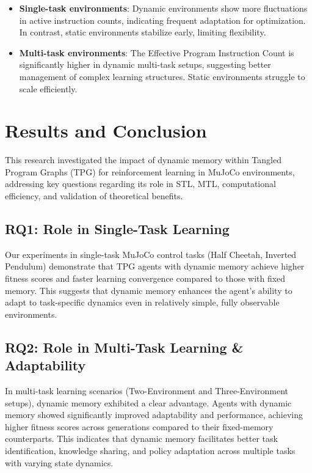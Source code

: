 \documentclass[sigconf]{acmart}
\begin{document}
\begin{itemize}
  \item \textbf{Single-task environments}: Dynamic environments show more fluctuations in active instruction counts, indicating frequent adaptation for optimization. In contrast, static environments stabilize early, limiting flexibility.
  \item \textbf{Multi-task environments}: The Effective Program Instruction Count is significantly higher in dynamic multi-task setups, suggesting better management of complex learning structures. Static environments struggle to scale efficiently.
\end{itemize}

\section{Results and Conclusion}
\label{sec:results}

This research investigated the impact of dynamic memory within Tangled Program Graphs (TPG) for 
reinforcement learning in MuJoCo environments, addressing key questions regarding its role in 
STL, MTL, computational efficiency, and validation of theoretical benefits.

\subsection{RQ1: Role in Single-Task Learning} 
Our experiments in single-task MuJoCo control tasks (Half Cheetah, Inverted Pendulum) demonstrate 
that TPG agents with dynamic memory achieve higher fitness scores and faster learning convergence 
compared to those with fixed memory. This suggests that dynamic memory enhances the agent's ability 
to adapt to task-specific dynamics even in relatively simple, fully observable environments.

\subsection{RQ2: Role in Multi-Task Learning \& Adaptability} 
In multi-task learning scenarios (Two-Environment and Three-Environment setups), dynamic memory exhibited a clear advantage. 
Agents with dynamic memory showed significantly improved adaptability and performance, achieving 
higher fitness scores across generations compared to their fixed-memory counterparts. This indicates 
that dynamic memory facilitates better task identification, knowledge sharing, and policy adaptation 
across multiple tasks with varying state dynamics.
\end{document}
